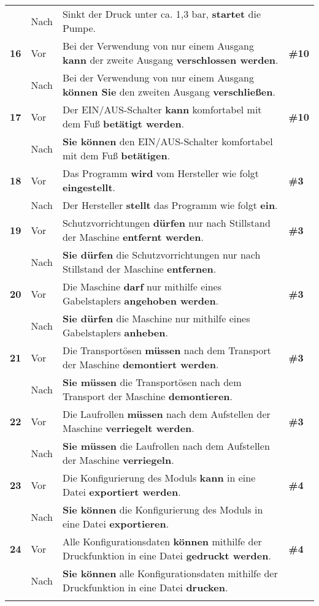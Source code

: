 \begin{longtable}{llp{}l}
& Nach & Sinkt der Druck unter ca. 1,3 bar, \textbf{startet} die Pumpe. & \\
\tablevspace
{ \textbf{16}} & Vor & Bei der Verwendung von nur einem Ausgang \textbf{kann} der zweite Ausgang \textbf{verschlossen werden}. & \textbf{\#10}\\
& Nach & Bei der Verwendung von nur einem Ausgang \textbf{können Sie} den zweiten Ausgang \textbf{verschließen}. & \\
\tablevspace
{ \textbf{17}} & Vor & Der EIN/AUS-Schalter \textbf{kann} komfortabel mit dem Fuß \textbf{betätigt werden}. & \textbf{\#10}\\
& Nach & \textbf{Sie können} den EIN/AUS-Schalter komfortabel mit dem Fuß \textbf{betätigen}. & \\
\tablevspace
{ \textbf{18}} & Vor & Das Programm \textbf{wird} vom Hersteller wie folgt \textbf{eingestellt}. & \textbf{\#3}\\
& Nach & Der Hersteller \textbf{stellt} das Programm wie folgt \textbf{ein}. & \\
\tablevspace
{ \textbf{19}} & Vor & Schutzvorrichtungen \textbf{dürfen} nur nach Stillstand der Maschine \textbf{entfernt werden}. & \textbf{\#3}\\
& Nach & \textbf{Sie dürfen} die Schutzvorrichtungen nur nach Stillstand der Maschine \textbf{entfernen}. & \\
\tablevspace
{ \textbf{20}} & Vor & Die Maschine \textbf{darf} nur mithilfe eines Gabelstaplers \textbf{angehoben werden}. & \textbf{\#3}\\
& Nach & \textbf{Sie dürfen} die Maschine nur mithilfe eines Gabelstaplers \textbf{anheben}. & \\
\tablevspace
{ \textbf{21}} & Vor & Die Transportösen \textbf{müssen} nach dem Transport der Maschine \textbf{demontiert werden}. & \textbf{\#3}\\
& Nach & \textbf{Sie müssen} die Transportösen nach dem Transport der Maschine \textbf{demontieren}. & \\
\tablevspace
{ \textbf{22}} & Vor & Die Laufrollen \textbf{müssen} nach dem Aufstellen der Maschine \textbf{verriegelt werden}. & \textbf{\#3}\\
& Nach & \textbf{Sie müssen} die Laufrollen nach dem Aufstellen der Maschine \textbf{verriegeln}. & \\
\tablevspace
{ \textbf{23}} & Vor & Die Konfigurierung des Moduls \textbf{kann} in eine Datei \textbf{exportiert werden}. & \textbf{\#4}\\
& Nach & \textbf{Sie können} die Konfigurierung des Moduls in eine Datei \textbf{exportieren}. & \\
\tablevspace
{ \textbf{24}} & Vor & Alle Konfigurationsdaten \textbf{können} mithilfe der Druckfunktion in eine Datei \textbf{gedruckt werden}. & \textbf{\#4}\\
& Nach & \textbf{Sie können} alle Konfigurationsdaten mithilfe der Druckfunktion in eine Datei \textbf{drucken}. & \\
\lspbottomrule
\end{longtable}


